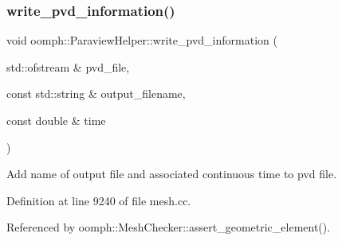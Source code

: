 \subsubsection{\texorpdfstring{write\+\_\+pvd\+\_\+information()}{write\_pvd\_information()}}
{\footnotesize\ttfamily void oomph\+::\+Paraview\+Helper\+::write\+\_\+pvd\+\_\+information (\begin{DoxyParamCaption}\item[{std\+::ofstream \&}]{pvd\+\_\+file,  }\item[{const std\+::string \&}]{output\+\_\+filename,  }\item[{const double \&}]{time }\end{DoxyParamCaption})}



Add name of output file and associated continuous time to pvd file. 



Definition at line 9240 of file mesh.\+cc.



Referenced by oomph\+::\+Mesh\+Checker\+::assert\+\_\+geometric\+\_\+element().

